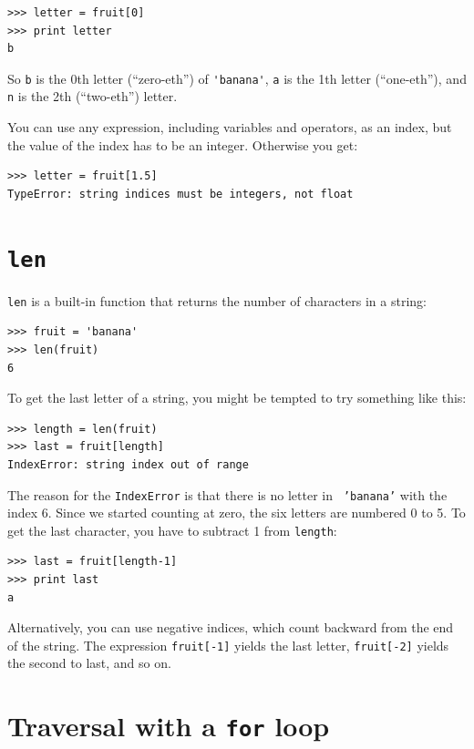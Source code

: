 \documentclass[10pt]{book}
\begin{document}
\begin{verbatim}
>>> letter = fruit[0]
>>> print letter
b
\end{verbatim}
%
So {\tt b} is the 0th letter (``zero-eth'') of \verb"'banana'", {\tt a}
is the 1th letter (``one-eth''), and {\tt n} is the 2th (``two-eth'')
letter.

You can use any expression, including variables and operators, as an
index, but the value of the index has to be an integer.  Otherwise you
get:

\begin{verbatim}
>>> letter = fruit[1.5]
TypeError: string indices must be integers, not float
\end{verbatim}
%

\section{{\tt len}}

{\tt len} is a built-in function that returns the number of characters
in a string:

\begin{verbatim}
>>> fruit = 'banana'
>>> len(fruit)
6
\end{verbatim}
%
To get the last letter of a string, you might be tempted to try something
like this:

\begin{verbatim}
>>> length = len(fruit)
>>> last = fruit[length]
IndexError: string index out of range
\end{verbatim}
%
The reason for the {\tt IndexError} is that there is no letter in {\tt
'banana'} with the index 6.  Since we started counting at zero, the
six letters are numbered 0 to 5.  To get the last character, you have
to subtract 1 from {\tt length}:

\begin{verbatim}
>>> last = fruit[length-1]
>>> print last
a
\end{verbatim}
%
Alternatively, you can use negative indices, which count backward from
the end of the string.  The expression {\tt fruit[-1]} yields the last
letter, {\tt fruit[-2]} yields the second to last, and so on.


\section{Traversal with a {\tt for} loop}
\label{for}
\end{document}
